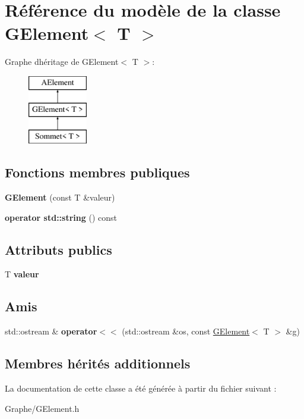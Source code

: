 \hypertarget{class_g_element}{}\section{Référence du modèle de la classe G\+Element$<$ T $>$}
\label{class_g_element}
Graphe d\textquotesingle{}héritage de G\+Element$<$ T $>$\+:\begin{figure}[H]
\begin{center}
\leavevmode
\includegraphics[height=3.000000cm]{class_g_element}
\end{center}
\end{figure}
\subsection*{Fonctions membres publiques}
\begin{DoxyCompactItemize}
\item 
\mbox{\label{class_g_element_aa146c9f9ba963801625e2a3dff44f158}} 
{\bfseries G\+Element} (const T \&valeur)
\item 
\mbox{\label{class_g_element_a49324204c5ab68edda8cb9e1bbbd9427}} 
{\bfseries operator std\+::string} () const
\end{DoxyCompactItemize}
\subsection*{Attributs publics}
\begin{DoxyCompactItemize}
\item 
\mbox{\label{class_g_element_a13f5bef10c2f47e9304b57f8de5891e7}} 
T {\bfseries valeur}
\end{DoxyCompactItemize}
\subsection*{Amis}
\begin{DoxyCompactItemize}
\item 
\mbox{\label{class_g_element_a9665a4bc32e83d93522f6d739c837b89}} 
std\+::ostream \& {\bfseries operator$<$$<$} (std\+::ostream \&os, const \mbox{\hyperlink{class_g_element}{G\+Element}}$<$ T $>$ \&g)
\end{DoxyCompactItemize}
\subsection*{Membres hérités additionnels}


La documentation de cette classe a été générée à partir du fichier suivant \+:\begin{DoxyCompactItemize}
\item 
Graphe/G\+Element.\+h\end{DoxyCompactItemize}
